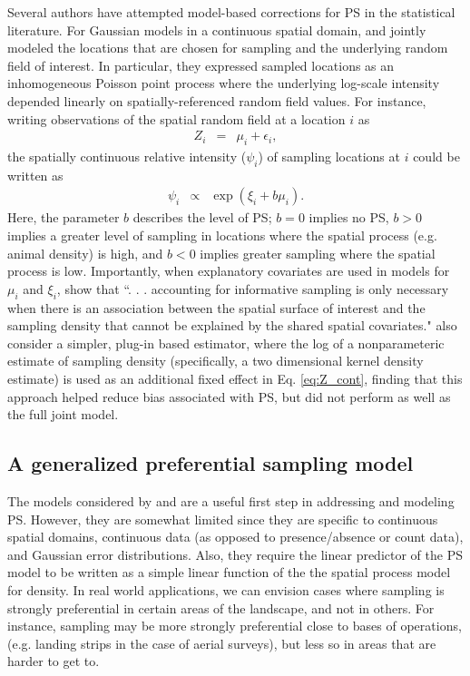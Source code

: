 \documentclass[times,mee,doublespace,]{besauth2}
\begin{document}
Several authors have attempted model-based corrections for PS in the statistical literature. For Gaussian models in a continuous spatial domain, \citet{DiggleEtAl2010} and \citet{PatiEtAl2011} jointly modeled the locations that are chosen for sampling and the underlying random field of interest.  In particular, they expressed sampled locations as an inhomogeneous Poisson point process where the underlying log-scale intensity depended linearly on spatially-referenced random field values.  For instance, writing observations of the spatial random field at a location $i$ as
\begin{eqnarray}
   Z_i & = & \mu_i + \epsilon_i,
   \label{eq:Z_cont}
\end{eqnarray}
the spatially continuous relative intensity ($\psi_i$) of sampling locations at $i$ could be written as
\begin{eqnarray}
   \psi_i & \propto & \exp(\xi_i + b \mu_i).
   \label{eq:p_cont}
\end{eqnarray}
Here, the parameter $b$ describes the level of PS; $b=0$ implies no PS, $b>0$ implies a greater level of sampling in locations where the spatial process (e.g. animal density) is high, and $b<0$ implies greater sampling where the spatial process is low.  Importantly, when explanatory covariates are used in models for $\mu_i$ and $\xi_i$, \citet{PatiEtAl2011} show that ``. . . accounting for informative sampling is only necessary when there
is an association between the spatial surface of interest and the sampling density that cannot be
explained by the shared spatial covariates."  \citet{PatiEtAl2011} also consider a simpler, plug-in based estimator, where the log of a nonparameteric estimate of sampling density (specifically, a two dimensional kernel density estimate) is used as an additional fixed effect in Eq. \ref{eq:Z_cont}, finding that this approach helped reduce bias associated with PS, but did not perform as well as the full joint model.

\subsection{A generalized preferential sampling model}

The models considered by \citet{DiggleEtAl2010} and \citet{PatiEtAl2011} are a useful first step in addressing and modeling PS.  However, they are somewhat limited since they are specific to continuous spatial domains, continuous data (as opposed to presence/absence or count data), and Gaussian error distributions.  Also, they require the linear predictor of the PS model to be written as a simple linear function of the the spatial process model for density.  In real world applications, we can envision cases where sampling is strongly preferential in certain areas of the landscape, and not in others.  For instance, sampling may be more strongly preferential close to bases of operations, (e.g. landing strips in the case of aerial surveys), but less so in areas that are harder to get to.
\end{document}
